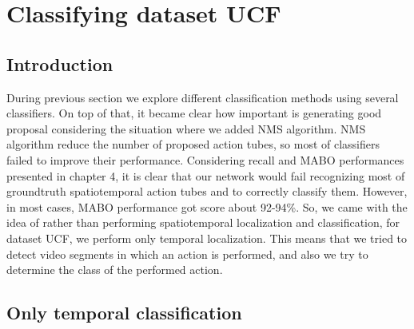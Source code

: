 \section{Classifying dataset UCF}
\subsection{Introduction}
During previous section we explore different classification methods using several classifiers. On top of that, it became clear how important is generating good proposal considering the situation
where we added NMS algorithm. NMS algorithm reduce the number of proposed action tubes, so most of classifiers failed to improve their performance. Considering recall and MABO performances presented
in chapter 4, it is clear that our network would fail recognizing most of groundtruth spatiotemporal action tubes and to correctly classify them. However, in most cases, MABO performance
got score about 92-94\%. So, we came with the idea of rather than performing spatiotemporal localization and
classification, for dataset UCF, we perform only temporal localization. This means that  we tried to detect video segments in which an action is performed, and also we try
to determine the class of the performed action.


\subsection{Only temporal classification}

